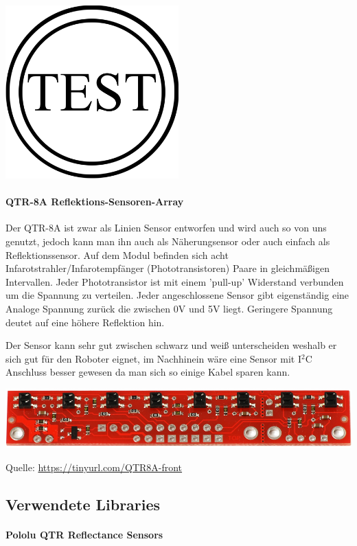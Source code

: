 \documentclass[12pt]{article}
\newcommand*{\quelle}{%
  \footnotesize Quelle: 
}
\begin{document}
\includegraphics[width=0.5\textwidth]{example.png}
\newpage

\paragraph{QTR-8A Reflektions-Sensoren-Array} Der QTR-8A ist zwar als Linien Sensor entworfen und wird auch so von uns genutzt, jedoch kann man ihn auch als Näherungsensor oder auch einfach als Reflektionssensor. Auf dem Modul befinden sich acht Infarotstrahler/Infarotempfänger (Phototransistoren) Paare in gleichmäßigen Intervallen. Jeder Phototransistor ist mit einem 'pull-up' Widerstand verbunden um die Spannung zu verteilen. Jeder angeschlossene Sensor gibt eigenständig eine Analoge Spannung zurück die zwischen 0V und 5V liegt. Geringere Spannung deutet auf eine höhere Reflektion hin.

Der Sensor kann sehr gut zwischen schwarz und weiß unterscheiden weshalb er sich gut für den Roboter eignet, im Nachhinein wäre eine Sensor mit I$^2$C Anschluss besser gewesen da man sich so einige Kabel sparen kann.

\vspace{0.5cm}
\includegraphics[width=1\textwidth]{QTR-8A.jpg}\par
\quelle\url{https://tinyurl.com/QTR8A-front}

\subsection{Verwendete Libraries}
\paragraph{Pololu QTR Reflectance Sensors}



\end{document}
